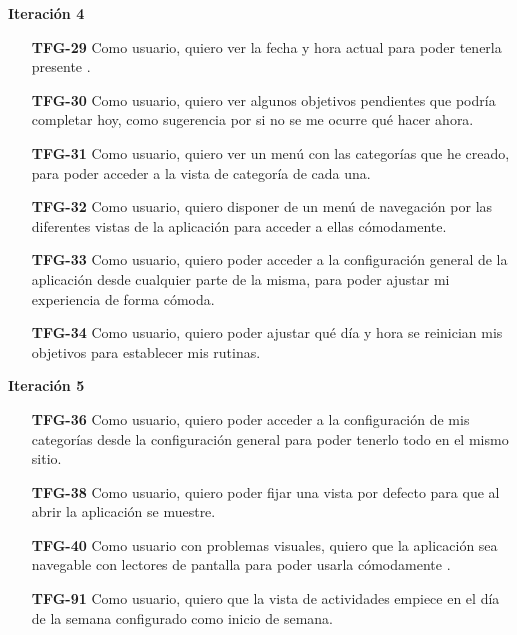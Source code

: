 \documentclass[10pt, a4paper]{aqademic}
\begin{document}
\textbf{Iteración 4}
\begin{itemize}[leftmargin=16mm]
	\item [\textbf{TFG-29}] Como usuario, quiero ver la fecha y hora actual para poder tenerla presente .

	\item [\textbf{TFG-30}] Como usuario, quiero ver algunos objetivos pendientes que podría completar hoy, como sugerencia por si no se me ocurre qué hacer ahora.
	
	\item [\textbf{TFG-31}] Como usuario, quiero ver un menú con las categorías que he creado, para poder acceder a la vista de categoría de cada una.
	
	\item [\textbf{TFG-32}] Como usuario, quiero disponer de un menú de navegación por las diferentes vistas de la aplicación para acceder a ellas cómodamente.
	
	\item [\textbf{TFG-33}] Como usuario, quiero poder acceder a la configuración general de la aplicación desde cualquier parte de la misma, para poder ajustar mi experiencia de forma cómoda.
	
	\item [\textbf{TFG-34}] Como usuario, quiero poder ajustar qué día y hora se reinician mis objetivos para establecer mis rutinas.
\end{itemize}

\textbf{Iteración 5}
\begin{itemize}[leftmargin=16mm]
	\item [\textbf{TFG-36}] Como usuario, quiero poder acceder a la configuración de mis categorías desde la configuración general para poder tenerlo todo en el mismo sitio.

	\item [\textbf{TFG-38}] Como usuario, quiero poder fijar una vista por defecto para que al abrir la aplicación se muestre.
	
	\item [\textbf{TFG-40}] Como usuario con problemas visuales, quiero que la aplicación sea navegable con lectores de pantalla para poder usarla cómodamente .
	
	\item [\textbf{TFG-91}] Como usuario, quiero que la vista de actividades empiece en el día de la semana configurado como inicio de semana.
\end{itemize}
\end{document}

